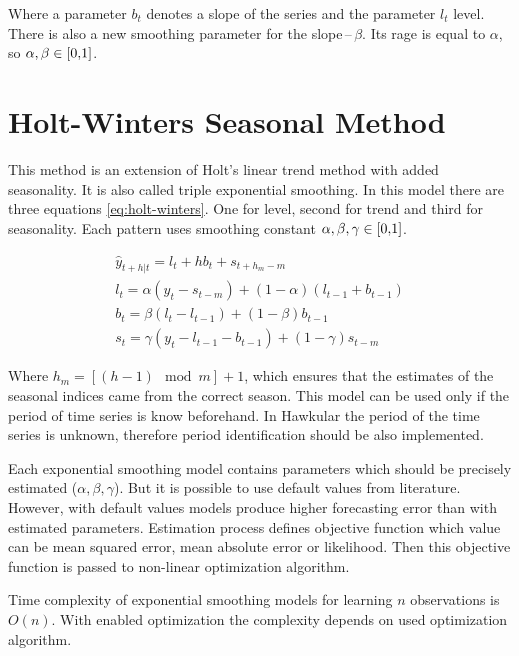     Where a parameter $b_t$ denotes a slope of the series and the parameter $l_t$ level. There is also a new smoothing
    parameter for the slope\,--\,$\beta$. Its rage is equal to $\alpha$, so $\alpha,\beta \in \interval[{0,1}]$.

    \section{Holt-Winters Seasonal Method} \label{sec:triple-ex}
    This method is an extension of Holt's linear trend method with added seasonality. It is also called triple
    exponential smoothing. In this model there are three equations \ref{eq:holt-winters}. One for level, second for
    trend and third for seasonality. Each pattern uses smoothing constant $ \alpha,\beta,\gamma \in \interval[{0,1}]$.

    \begin{gather} \label{eq:holt-winters}
        \hat{y}_{t+h|t} = l_{t} + hb_{t} + s_{t+h_m-m}\\ \nonumber
        l_t = \alpha (y_t - s_{t-m}) + (1 - \alpha) (l_{t-1} + b_{t-1}) \\ \nonumber
        b_t = \beta (l_t - l_{t-1}) + (1 - \beta)b_{t-1} \\ \nonumber
        s_t = \gamma (y_t - l_{t-1} - b_{t-1}) + (1-\gamma)s_{t-m}
    \end{gather}

    Where $h_m=[(h-1) \mod m] + 1$, which ensures that the estimates of the seasonal indices came from the correct
    season. This model can be used only if the period of time series is know beforehand. In Hawkular the period  of
    the time series is unknown, therefore period identification should be also implemented.

    Each exponential smoothing model contains parameters which should be precisely estimated ($\alpha, \beta,
    \gamma$). But it is possible to use default values from literature. However, with default values models produce
    higher forecasting error than with estimated parameters. Estimation process defines objective function which
    value can be mean squared error, mean absolute error or likelihood. Then this objective function is passed to
    non-linear optimization algorithm.

    Time complexity of exponential smoothing models for learning $n$ observations is $O(n)$. With enabled optimization
    the complexity depends on used optimization algorithm.

